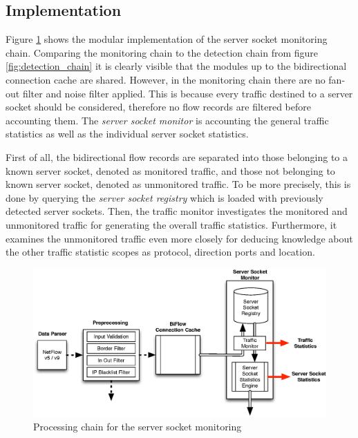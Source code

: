 \subsection{Implementation}

Figure \ref{fig:monitoring_chain} shows the modular implementation of the
\gls{server socket} monitoring chain. Comparing the monitoring chain to the
detection chain from figure \ref{fig:detection_chain} it is clearly visible that
the modules up to the bidirectional connection cache are shared. However, in the
monitoring chain there are no fan-out filter and noise filter applied. This is
because every traffic destined to a \gls{server socket} should be considered,
therefore no flow records are filtered before accounting them. The
\emph{server socket monitor} is accounting the general traffic statistics as
well as the individual \gls{server socket} statistics.

First of all, the bidirectional flow records are separated into those belonging
to a known \gls{server socket}, denoted as monitored traffic, and those not
belonging to known \gls{server socket}, denoted as unmonitored traffic.
To be more precisely, this is done by querying the \emph{server socket registry}
which is loaded with previously detected \glspl{server socket}. Then, the
traffic monitor investigates the monitored and unmonitored traffic for
generating the overall traffic statistics.
Furthermore, it examines the unmonitored traffic even more closely for deducing
knowledge about the other traffic statistic scopes as protocol, direction
ports and location.

\begin{figure}[hb]
	\centering
	\includegraphics[width=\linewidth]{images/TrackingChain.eps}
	\caption{Processing chain for the server socket monitoring}
	\label{fig:monitoring_chain}
\end{figure}

